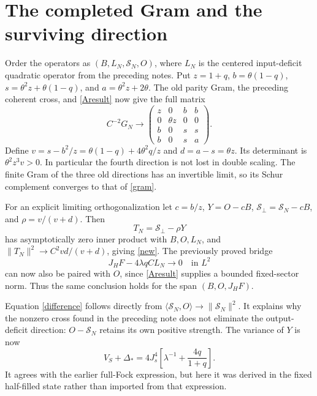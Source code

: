 \documentclass[11pt,a4paper]{article}
\begin{document}
\newpage
\section{The completed Gram and the surviving direction}
Order the operators as $(B,L_N,\mathcal S_N,O)$, where $L_N$
is the centered input-deficit quadratic operator from the preceding
notes. Put $z=1+q$, $b=\theta(1-q)$,
$s=\theta^2z+\theta(1-q)$, and $a=\theta^2z+2\theta$.
The old parity Gram, the preceding coherent cross, and
\eqref{Aresult} now give the full matrix
\begin{equation}
 C^{-2}G_N\longrightarrow
 \begin{pmatrix}
 z&0&b&b\\
 0&\theta z&0&0\\
 b&0&s&s\\
 b&0&s&a
 \end{pmatrix}.\label{gram}
\end{equation}
Define $v=s-b^2/z=\theta(1-q)+4\theta^2q/z$ and
$d=a-s=\theta z$. Its determinant is $\theta^2z^3v>0$.
In particular the fourth direction is not lost in double scaling.
The finite Gram of the three old directions has an invertible
limit, so its Schur complement converges to that of \eqref{gram}.

For an explicit limiting orthogonalization let
$c=b/z$, $Y=O-cB$, $\mathcal S_\perp=\mathcal S_N-cB$,
and $\rho=v/(v+d)$. Then
\begin{equation}
 T_N=\mathcal S_\perp-\rho Y
\end{equation}
has asymptotically zero inner product with $B,O,L_N$, and
$\|T_N\|^2\to C^2vd/(v+d)$, giving \eqref{new}.
The previously proved bridge
\begin{equation}
 J_HF-4\lambda q C L_N\longrightarrow0\quad\text{in }L^2
\end{equation}
can now also be paired with $O$, since \eqref{Aresult} supplies
a bounded fixed-sector norm. Thus the same conclusion holds for
the span $(B,O,J_HF)$.

Equation \eqref{difference} follows directly from
$\langle\mathcal S_N,O\rangle\to\|\mathcal S_N\|^2$.
It explains why the nonzero cross found in the preceding note does
not eliminate the output-deficit direction: $O-\mathcal S_N$
retains its own positive strength. The variance of $Y$ is now
\begin{equation}
 V_S+\Delta_*=4J_s^4\left[\lambda^{-1}+\frac{4q}{1+q}\right].
\end{equation}
It agrees with the earlier full-Fock expression, but here it was
derived in the fixed half-filled state rather than imported from
that expression.
\end{document}
